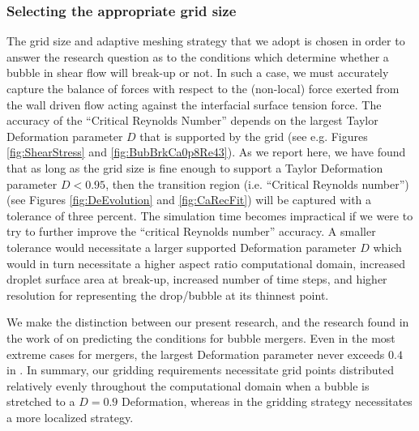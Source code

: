 \documentclass{elsarticle}
\begin{document}
\subsubsection{Selecting the appropriate grid size \label{convergence} }

The grid size and adaptive meshing strategy that we adopt is chosen in order to
answer the research question as to the conditions which determine whether a
bubble in shear flow will break-up or not.  In such a case, we must accurately
capture the balance of forces with respect to the (non-local) force exerted
from the wall driven flow acting against the interfacial surface tension force.
The accuracy of the ``Critical Reynolds Number'' depends on the largest Taylor
Deformation parameter $D$ that is supported by the grid (see e.g. Figures
\ref{fig:ShearStress} and \ref{fig:BubBrkCa0p8Re43}).  As we report here, we
have found that as long as the grid size is fine enough to support a Taylor
Deformation parameter $D<0.95$, then the transition region (i.e. ``Critical
Reynolds number'') (see Figures \ref{fig:DeEvolution} and \ref{fig:CaRecFit})
will be captured with a tolerance of three percent.  The simulation time
becomes impractical if we were to try to further improve the ``critical
Reynolds number'' accuracy.  A smaller tolerance would necessitate a larger
supported Deformation parameter $D$ which would in turn necessitate a higher
aspect ratio computational domain, increased droplet surface area at break-up,
increased number of time steps, and higher resolution for representing the
drop/bubble at its thinnest point.

We make the distinction between our present research, and the research found in
the work of  \citet{zhang2021three,zhang2022three} on
predicting the conditions for bubble mergers.  Even in the most extreme cases
for mergers, the largest Deformation parameter never exceeds $0.4$ in
\citet{zhang2021three}.  In summary, our gridding requirements necessitate grid
points distributed relatively evenly throughout the computational domain when a
bubble is stretched to a $D=0.9$ Deformation, whereas in \citet{zhang2021three}
the gridding strategy necessitates a more localized strategy.
\end{document}
